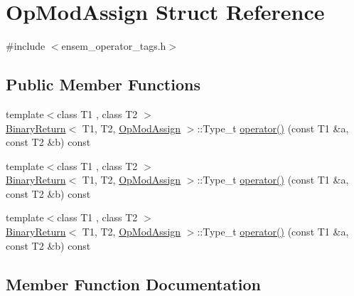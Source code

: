 \hypertarget{structOpModAssign}{}\section{Op\+Mod\+Assign Struct Reference}
\label{structOpModAssign}


{\ttfamily \#include $<$ensem\+\_\+operator\+\_\+tags.\+h$>$}

\subsection*{Public Member Functions}
\begin{DoxyCompactItemize}
\item 
{\footnotesize template$<$class T1 , class T2 $>$ }\\\mbox{\hyperlink{structBinaryReturn}{Binary\+Return}}$<$ T1, T2, \mbox{\hyperlink{structOpModAssign}{Op\+Mod\+Assign}} $>$\+::Type\+\_\+t \mbox{\hyperlink{structOpModAssign_ae4cd6a2eeb0dd164ae1f38821fd596d6}{operator()}} (const T1 \&a, const T2 \&b) const
\item 
{\footnotesize template$<$class T1 , class T2 $>$ }\\\mbox{\hyperlink{structBinaryReturn}{Binary\+Return}}$<$ T1, T2, \mbox{\hyperlink{structOpModAssign}{Op\+Mod\+Assign}} $>$\+::Type\+\_\+t \mbox{\hyperlink{structOpModAssign_ae4cd6a2eeb0dd164ae1f38821fd596d6}{operator()}} (const T1 \&a, const T2 \&b) const
\item 
{\footnotesize template$<$class T1 , class T2 $>$ }\\\mbox{\hyperlink{structBinaryReturn}{Binary\+Return}}$<$ T1, T2, \mbox{\hyperlink{structOpModAssign}{Op\+Mod\+Assign}} $>$\+::Type\+\_\+t \mbox{\hyperlink{structOpModAssign_ae4cd6a2eeb0dd164ae1f38821fd596d6}{operator()}} (const T1 \&a, const T2 \&b) const
\end{DoxyCompactItemize}


\subsection{Member Function Documentation}
\mbox{\label{structOpModAssign_ae4cd6a2eeb0dd164ae1f38821fd596d6}} 
